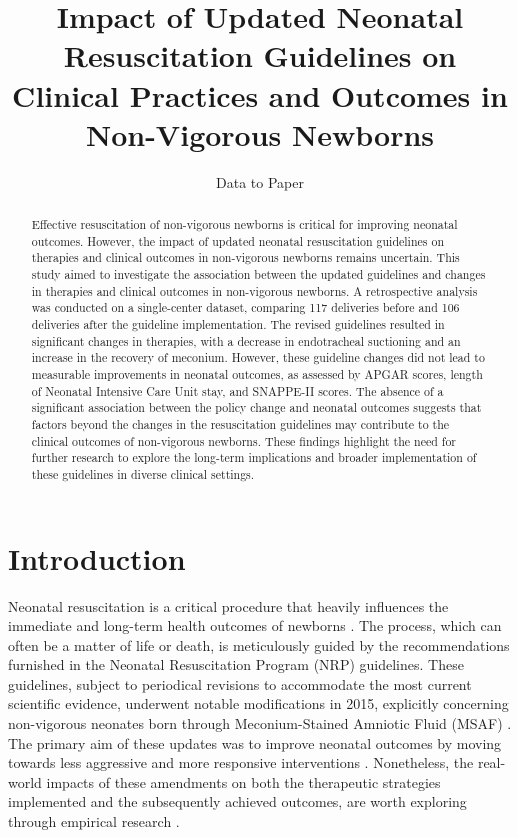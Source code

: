 \documentclass[11pt]{article}
\title{Impact of Updated Neonatal Resuscitation Guidelines on Clinical Practices and Outcomes in Non-Vigorous Newborns}
\author{Data to Paper}
\begin{document}
\maketitle
\begin{abstract}Effective resuscitation of non-vigorous newborns is critical for improving neonatal outcomes. However, the impact of updated neonatal resuscitation guidelines on therapies and clinical outcomes in non-vigorous newborns remains uncertain. This study aimed to investigate the association between the updated guidelines and changes in therapies and clinical outcomes in non-vigorous newborns. A retrospective analysis was conducted on a single-center dataset, comparing 117 deliveries before and 106 deliveries after the guideline implementation. The revised guidelines resulted in significant changes in therapies, with a decrease in endotracheal suctioning and an increase in the recovery of meconium. However, these guideline changes did not lead to measurable improvements in neonatal outcomes, as assessed by APGAR scores, length of Neonatal Intensive Care Unit stay, and SNAPPE-II scores. The absence of a significant association between the policy change and neonatal outcomes suggests that factors beyond the changes in the resuscitation guidelines may contribute to the clinical outcomes of non-vigorous newborns. These findings highlight the need for further research to explore the long-term implications and broader implementation of these guidelines in diverse clinical settings.\end{abstract}
\section*{Introduction}

Neonatal resuscitation is a critical procedure that heavily influences the immediate and long-term health outcomes of newborns \cite{Boyle2015NeonatalOA, Chawla2020PerinatalNeonatalMO, Stoll2010NeonatalOO}. The process, which can often be a matter of life or death, is meticulously guided by the recommendations furnished in the Neonatal Resuscitation Program (NRP) guidelines. These guidelines, subject to periodical revisions to accommodate the most current scientific evidence, underwent notable modifications in 2015, explicitly concerning non-vigorous neonates born through Meconium-Stained Amniotic Fluid (MSAF) \cite{Wyckoff2015Part1N}. The primary aim of these updates was to improve neonatal outcomes by moving towards less aggressive and more responsive interventions \cite{Halliday2001EndotrachealIA, Hishikawa2016RespiratorySA}. Nonetheless, the real-world impacts of these amendments on both the therapeutic strategies implemented and the subsequently achieved outcomes, are worth exploring through empirical research \cite{Boundy2016KangarooMC, Salvatore2020NeonatalMA}.
\end{document}

